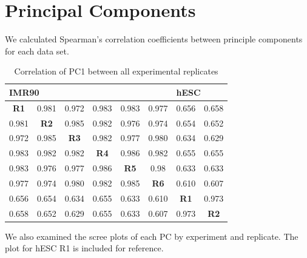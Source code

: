 \section*{Principal Components}

We calculated Spearman's correlation coefficients between principle components for each data set.

\begin{table}[h]
  \centering
  \caption{Correlation of PC1 between all experimental replicates}\label{table:PC1Correlations}
  \begin{tabularx}{\textwidth}{@{}cccccccc@{}}
    \toprule
    \multicolumn{6}{l}{IMR90} & \multicolumn{2}{l}{hESC} \\
    \midrule
    \textbf{R1} & 0.981       & 0.972       & 0.983       & 0.983       & 0.977       & 0.656       & 0.658 \\
    0.981       & \textbf{R2} & 0.985       & 0.982       & 0.976       & 0.974       & 0.654       & 0.652 \\
    0.972       & 0.985       & \textbf{R3} & 0.982       & 0.977       & 0.980       & 0.634       & 0.629 \\
    0.983       & 0.982       & 0.982       & \textbf{R4} & 0.986       & 0.982       & 0.655       & 0.655 \\
    0.983       & 0.976       & 0.977       & 0.986       & \textbf{R5} & 0.98        & 0.633       & 0.633 \\
    0.977       & 0.974       & 0.980       & 0.982       & 0.985       & \textbf{R6} & 0.610       & 0.607 \\
    0.656       & 0.654       & 0.634       & 0.655       & 0.633       & 0.610       & \textbf{R1} & 0.973  \\
    0.658       & 0.652       & 0.629       & 0.655       & 0.633       & 0.607       & 0.973       & \textbf{R2}    \\
    \bottomrule
  \end{tabularx}
\end{table}

We also examined the scree plots of each \gls{PC} by experiment and replicate.  The plot for hESC R1 is included for reference.

